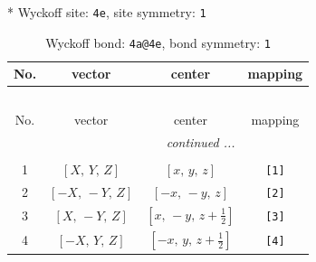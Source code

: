\documentclass[fleqn,8pt]{jsarticle}
\begin{document}
* Wyckoff site: {\tt 4e}, site symmetry: {\tt 1}
\renewcommand{\arraystretch}{1.2}
\begin{longtable}{cccc}
\caption{Wyckoff bond: {\tt 4a@4e}, bond symmetry: {\tt 1}}
 \\
 \hline \hline
No. & vector & center & mapping \\ \hline \endfirsthead

\multicolumn{3}{l}{\tablename\ \thetable{}} \\
 \hline \hline
No. & vector & center & mapping \\ \hline \endhead

 \hline \hline
\multicolumn{3}{r}{\footnotesize\it continued ...} \\ \endfoot

 \hline \hline
\multicolumn{3}{r}{} \\ \endlastfoot

1 & $\left[ X,\, Y,\, Z \right]$ & $\left[ x,\, y,\, z \right]$ & {\tt [1]} \\ \hline
2 & $\left[ - X,\, - Y,\, Z \right]$ & $\left[ - x,\, - y,\, z \right]$ & {\tt [2]} \\ \hline
3 & $\left[ X,\, - Y,\, Z \right]$ & $\left[ x,\, - y,\, z + \frac{1}{2} \right]$ & {\tt [3]} \\ \hline
4 & $\left[ - X,\, Y,\, Z \right]$ & $\left[ - x,\, y,\, z + \frac{1}{2} \right]$ & {\tt [4]} \\
\end{longtable}
\end{document}
